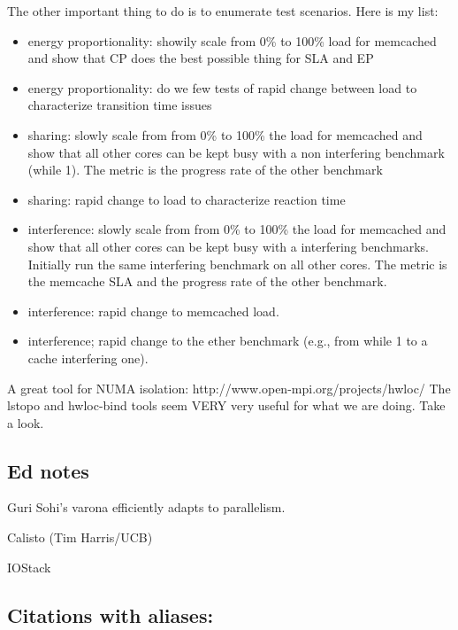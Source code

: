 The other important thing to do is to enumerate test scenarios. Here is my list:
\begin{itemize}

\item energy proportionality: showily scale from 0\% to 100\% load for
  memcached and show that CP does the best possible thing for SLA and
  EP

\item energy proportionality: do we few tests of rapid change between load to characterize transition time issues
\item  sharing: slowly scale from from 0\% to 100\% the load for memcached and show that all other cores can be kept busy with a non interfering benchmark (while 1). The metric is the progress rate of the other benchmark

\item sharing: rapid change to load to characterize reaction time

\item interference: slowly scale from from 0\% to 100\% the load for memcached and show that all other cores can be kept busy with a interfering benchmarks. Initially run the same interfering benchmark on all other cores. The metric is the memcache SLA and the progress rate of the other benchmark. 

\item interference: rapid change to memcached load. 
\item interference; rapid change to the ether benchmark (e.g., from while 1 to a cache interfering one). 
\end{itemize}


A great tool for NUMA isolation: 
http://www.open-mpi.org/projects/hwloc/
The lstopo and hwloc-bind tools seem VERY very useful for what we are doing. Take a look. 


\subsection{Ed notes}


Guri Sohi's varona\cite{DBLP:conf/pldi/SridharanGS14} efficiently adapts to parallelism.

Calisto (Tim Harris/UCB) \cite{DBLP:conf/eurosys/HarrisMM14}

IOStack \cite{DBLP:conf/usenix/ShalevSBB10}



\subsection{Citations with aliases:}


